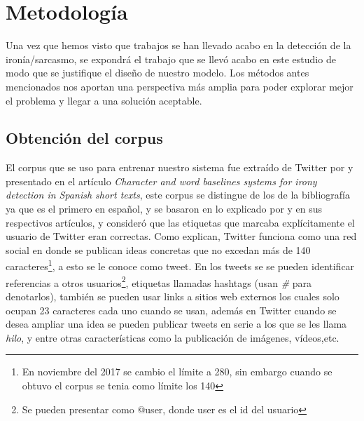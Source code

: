 \chapter{Metodología}\label{cap.metodologia}

\par Una vez que hemos visto que trabajos se han llevado acabo en la detección de la ironía/sarcasmo, se expondrá el trabajo que se llevó acabo en este estudio de modo que se justifique el diseño de nuestro modelo. Los métodos antes mencionados nos aportan una perspectiva más amplia para poder explorar mejor el problema y llegar a una solución aceptable.
\section{Obtención del corpus}
\par El corpus que se uso para entrenar nuestro sistema fue extraído de Twitter por \cite{lopez2016character} y presentado en el artículo \textit{Character and word baselines systems for irony detection in Spanish short texts}, este corpus se distingue de los de la bibliografía ya que es el primero en español, y se basaron en lo explicado por \cite{reyes2012making} y \cite{liebrecht2013perfect} en sus respectivos artículos, y consideró que las etiquetas que marcaba explícitamente el usuario de Twitter eran correctas. Como \cite{lopez2016character} explican, Twitter funciona como una red social en donde se publican ideas concretas que no excedan más de 140 caracteres\footnote[1]{En noviembre del 2017 se cambio el límite a 280, sin embargo cuando se obtuvo el corpus se tenia como límite los 140}, a esto se le conoce como tweet. En los tweets se  se pueden identificar referencias a otros usuarios\footnote{Se pueden presentar como @user, donde user es el id del usuario}, etiquetas llamadas hashtags (usan \textit{\#} para denotarlos), también se pueden usar links a sitios web externos los cuales solo ocupan 23 caracteres cada uno cuando se usan, además en Twitter cuando se desea ampliar una idea se pueden publicar tweets en serie a los que se les llama \textit{hilo}, y entre otras características como la publicación de imágenes, vídeos,etc.


